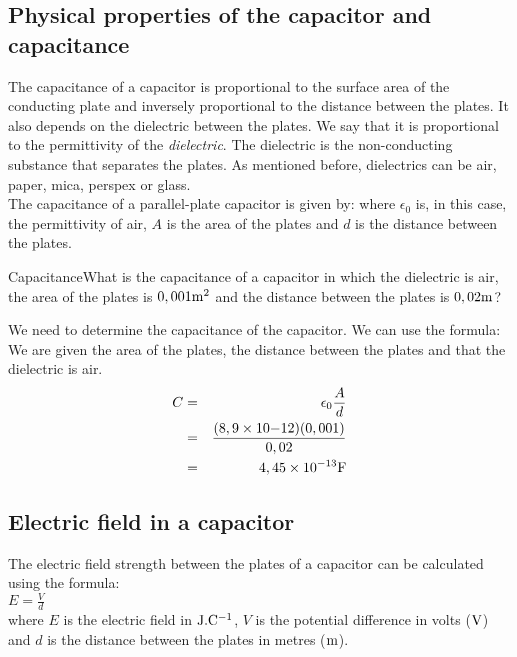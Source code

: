 \subsection{Physical properties of the capacitor and capacitance}

The capacitance of a capacitor is proportional to the surface area of the
conducting plate and inversely proportional to the distance
between the plates. It also depends on the dielectric between the plates. We say that it is proportional to the permittivity of
the \textit{dielectric}. The dielectric is the non-conducting
substance that separates the plates. As mentioned before, dielectrics can be air, paper, mica, perspex
or glass.\\
 
The capacitance of a parallel-plate capacitor is given by:
 where $\epsilon_0$ is, in this case, the
permittivity of air, $A$ is the area of the plates and $d$ is the
distance between the plates.


\begin{wex}{Capacitance}{What is the capacitance of a capacitor in which the
dielectric is air, the area of the plates is $0,001 {\rm m^2}$ and the distance
between the plates is $0,02 {\rm m}$?}{ 
We need to determine the capacitance of the capacitor.
We can use the formula:
We are given the area of the plates, the distance between the plates and that the dielectric is air.
\begin{eqnarray}
C &=& \epsilon_0\frac{A}{d}\\
&=& \frac {(8,9 \times 10 {-12})(0,001)}{0,02}\\
&=& 4,45 \times 10^{-13} {\rm F}
\end{eqnarray}

}\end{wex}

\subsection{Electric field in a capacitor}

The electric field strength between the plates of a capacitor can be calculated using the formula:\\
$E = \frac{V}{d}$ \\ 
where $E$ is the electric field in ${\rm J.C^{-1}}$, $V$ is the potential difference in volts (${\rm V}$) and $d$ is the distance between the plates in metres (${\rm m}$).\\ 
 
